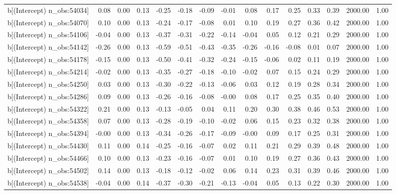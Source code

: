 \begin{table}[ht]
\begin{tabular}{rrrrrrrrrrrrrrr}
  b[(Intercept) n\_obs:54034] & 0.08 & 0.00 & 0.13 & -0.25 & -0.18 & -0.09 & -0.01 & 0.08 & 0.17 & 0.25 & 0.33 & 0.39 & 2000.00 & 1.00 \\ 
  b[(Intercept) n\_obs:54070] & 0.10 & 0.00 & 0.13 & -0.24 & -0.17 & -0.08 & 0.01 & 0.10 & 0.19 & 0.27 & 0.36 & 0.42 & 2000.00 & 1.00 \\ 
  b[(Intercept) n\_obs:54106] & -0.04 & 0.00 & 0.13 & -0.37 & -0.31 & -0.22 & -0.14 & -0.04 & 0.05 & 0.12 & 0.21 & 0.29 & 2000.00 & 1.00 \\ 
  b[(Intercept) n\_obs:54142] & -0.26 & 0.00 & 0.13 & -0.59 & -0.51 & -0.43 & -0.35 & -0.26 & -0.16 & -0.08 & 0.01 & 0.07 & 2000.00 & 1.00 \\ 
  b[(Intercept) n\_obs:54178] & -0.15 & 0.00 & 0.13 & -0.50 & -0.41 & -0.32 & -0.24 & -0.15 & -0.06 & 0.02 & 0.11 & 0.19 & 2000.00 & 1.00 \\ 
  b[(Intercept) n\_obs:54214] & -0.02 & 0.00 & 0.13 & -0.35 & -0.27 & -0.18 & -0.10 & -0.02 & 0.07 & 0.15 & 0.24 & 0.29 & 2000.00 & 1.00 \\ 
  b[(Intercept) n\_obs:54250] & 0.03 & 0.00 & 0.13 & -0.30 & -0.22 & -0.13 & -0.06 & 0.03 & 0.12 & 0.19 & 0.28 & 0.34 & 2000.00 & 1.00 \\ 
  b[(Intercept) n\_obs:54286] & 0.09 & 0.00 & 0.13 & -0.26 & -0.16 & -0.08 & -0.00 & 0.08 & 0.17 & 0.25 & 0.35 & 0.40 & 2000.00 & 1.00 \\ 
  b[(Intercept) n\_obs:54322] & 0.21 & 0.00 & 0.13 & -0.13 & -0.05 & 0.04 & 0.11 & 0.20 & 0.30 & 0.38 & 0.46 & 0.53 & 2000.00 & 1.00 \\ 
  b[(Intercept) n\_obs:54358] & 0.07 & 0.00 & 0.13 & -0.28 & -0.19 & -0.10 & -0.02 & 0.06 & 0.15 & 0.23 & 0.32 & 0.38 & 2000.00 & 1.00 \\ 
  b[(Intercept) n\_obs:54394] & -0.00 & 0.00 & 0.13 & -0.34 & -0.26 & -0.17 & -0.09 & -0.00 & 0.09 & 0.17 & 0.25 & 0.31 & 2000.00 & 1.00 \\ 
  b[(Intercept) n\_obs:54430] & 0.11 & 0.00 & 0.14 & -0.25 & -0.16 & -0.07 & 0.02 & 0.11 & 0.21 & 0.29 & 0.39 & 0.48 & 2000.00 & 1.00 \\ 
  b[(Intercept) n\_obs:54466] & 0.10 & 0.00 & 0.13 & -0.23 & -0.16 & -0.07 & 0.01 & 0.10 & 0.19 & 0.27 & 0.36 & 0.43 & 2000.00 & 1.00 \\ 
  b[(Intercept) n\_obs:54502] & 0.14 & 0.00 & 0.13 & -0.18 & -0.12 & -0.02 & 0.06 & 0.14 & 0.23 & 0.31 & 0.39 & 0.46 & 2000.00 & 1.00 \\ 
  b[(Intercept) n\_obs:54538] & -0.04 & 0.00 & 0.14 & -0.37 & -0.30 & -0.21 & -0.13 & -0.04 & 0.05 & 0.13 & 0.22 & 0.30 & 2000.00 & 1.00 \\ 

\end{tabular}
\end{table}
